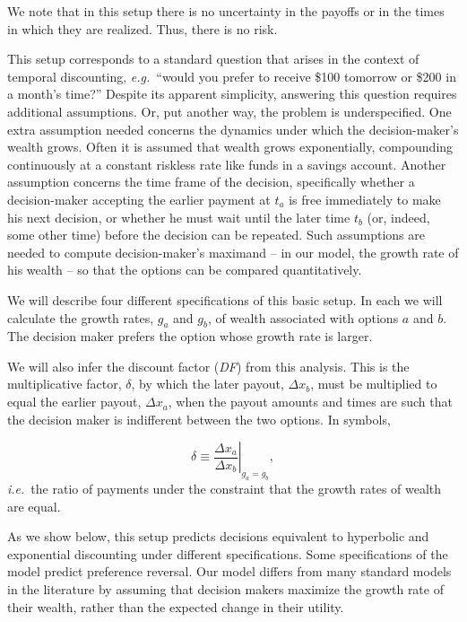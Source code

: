 \documentclass[11pt]{article}
\newcommand{\Sref}[1]{Section~\ref{sec:#1}}
\newcommand{\ie}{{\it i.e.}\ }
\newcommand{\eg}{{\it e.g.}\ }
\newcommand{\be}{\begin{equation}}
\newcommand{\ee}{\end{equation}}
\newcommand{\Dx}{\Delta x}
\numberwithin{equation}{section}
\begin{document}
We note that in this setup there is no uncertainty in the payoffs or in the times in which they are realized. Thus, there is no risk.

This setup corresponds to a standard question that arises in the context of temporal discounting, \eg ``would you prefer to receive \$100 tomorrow or \$200 in a month's time?'' Despite its apparent simplicity, answering this question requires additional assumptions. Or, put another way, the problem is underspecified. One extra assumption needed concerns the dynamics under which the decision-maker's wealth grows. Often it is assumed that wealth grows exponentially, compounding continuously at a constant riskless rate like funds in a savings account. Another assumption concerns the time frame of the decision, specifically whether a decision-maker accepting the earlier payment at $t_a$ is free immediately to make his next decision, or whether he must wait until the later time $t_b$ (or, indeed, some other time) before the decision can be repeated. Such assumptions are needed to compute decision-maker's maximand -- in our model, the growth rate of his wealth -- so that the options can be compared quantitatively.

We will describe four different specifications of this basic setup. In each we will calculate the growth rates, $g_a$ and $g_b$, of wealth associated with options $a$ and $b$. The decision maker prefers the option whose growth rate is larger.

We will also infer the discount factor (\textit{DF}) from this analysis. This is the multiplicative factor, $\delta$, by which the later payout, $\Dx_b$, must be multiplied to equal the earlier payout, $\Dx_a$, when the payout amounts and times are such that the decision maker is indifferent between the two options. In symbols,

\be
\delta \equiv \left.\frac{\Dx_a}{\Dx_b}\right|_{g_a=g_b},
\ee
\ie the ratio of payments under the constraint that the growth rates of wealth are equal.

As we show below, this setup predicts decisions equivalent to hyperbolic and exponential discounting under different specifications. Some specifications of the model predict preference reversal. Our model differs from many standard models in the literature by assuming that decision makers maximize the growth rate of their wealth, rather than the expected change in their utility.
\end{document}
